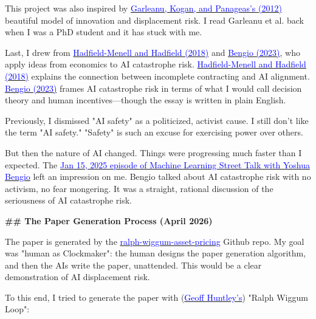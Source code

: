 \documentclass[12pt]{article}
\begin{document}
\begin{mdframed}[
linewidth=1pt,
linecolor=black,
innerleftmargin=0.25em,
innerrightmargin=0.25em,
innertopmargin=0.2\baselineskip,
innerbottommargin=0.8\baselineskip
]
This project was also inspired by \href{https://www.sciencedirect.com/science/article/abs/pii/S0304405X12000621}{\textcolor{blue}{Garleanu, Kogan, and Panageas's (2012)}} beautiful model of innovation and displacement risk. I read Garleanu et al. back when I was a PhD student and it has stuck with me.

Last, I drew from \href{https://arxiv.org/abs/1804.04268}{\textcolor{blue}{Hadfield-Menell and Hadfield (2018)}} and \href{https://www.journalofdemocracy.org/ai-and-catastrophic-risk/}{\textcolor{blue}{Bengio (2023)}}, who apply ideas from economics to AI catastrophe risk. \href{https://arxiv.org/abs/1804.04268}{\textcolor{blue}{Hadfield-Menell and Hadfield (2018)}} explains the connection between incomplete contracting and AI alignment. \href{https://www.journalofdemocracy.org/ai-and-catastrophic-risk/}{\textcolor{blue}{Bengio (2023)}} frames AI catastrophe risk in terms of what I would call decision theory and human incentives---though the essay is written in plain English.

Previously, I dismissed "AI safety" as a politicized, activist cause. I still don't like the term "AI safety." "Safety" is such an excuse for exercising power over others.

But then the nature of AI changed. Things were progressing much faster than I expected. The \href{https://podcasts.apple.com/ca/podcast/yoshua-bengio-designing-out-agency-for-safe-ai/id1510472996?i=1000684132955}{\textcolor{blue}{Jan 15, 2025 episode of Machine Learning Street Talk with Yoshua Bengio}} left an impression on me. Bengio talked about AI catastrophe risk with no activism, no fear mongering. It was a straight, rational discussion of the seriousness of AI catastrophe risk.

\par
{\large\bfseries \textcolor{red!70!black}{\#\# The Paper Generation Process (April 2026)}}
\par

The paper is generated by the \href{https://github.com/chenandrewy/ralph-wiggum-asset-pricing/tree/main}{\textcolor{blue}{ralph-wiggum-asset-pricing}} Github repo. My goal was "human as Clockmaker": the human designs the paper generation algorithm, and then the AIs write the paper, unattended. This would be a clear demonstration of AI displacement risk.

To this end, I tried to generate the paper with (\href{https://ghuntley.com/ralph/}{\textcolor{blue}{Geoff Huntley's}}) "Ralph Wiggum Loop":


\end{mdframed}
\end{document}
